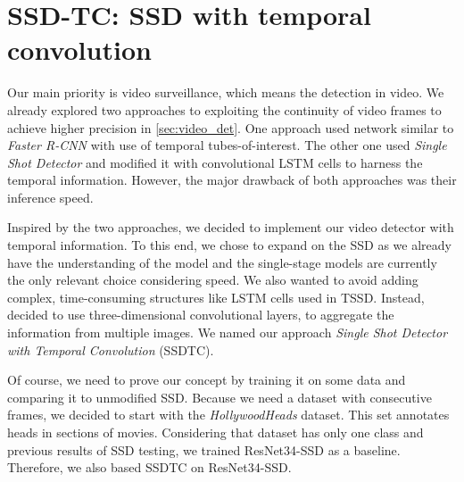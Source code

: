 \section{SSD-TC: SSD with temporal convolution}
Our main priority is video surveillance, which means the detection in video. We already explored two approaches to exploiting the continuity of video frames to achieve higher precision in \cref{sec:video_det}. One approach used network similar to \textit{Faster R-CNN} with use of temporal tubes-of-interest. The other one used \textit{Single Shot Detector} and modified it with convolutional LSTM cells to harness the temporal information. However, the major drawback of both approaches was their inference speed. 

Inspired by the two approaches, we decided to implement our video detector with temporal information. To this end, we chose to expand on the SSD as we already have the understanding of the model and the single-stage models are currently the only relevant choice considering speed. We also wanted to avoid adding complex, time-consuming structures like LSTM cells used in TSSD. Instead, decided to use three-dimensional convolutional layers, to aggregate the information from multiple images. We named our approach \textit{Single Shot Detector with Temporal Convolution} (SSDTC).

Of course, we need to prove our concept by training it on some data and comparing it to unmodified SSD. Because we need a dataset with consecutive frames, we decided to start with the \textit{HollywoodHeads} dataset. This set annotates heads in sections of movies. Considering that dataset has only one class and previous results of SSD testing, we trained ResNet34-SSD as a baseline. Therefore, we also based SSDTC on ResNet34-SSD.

